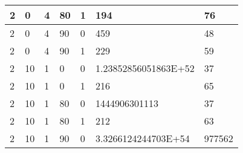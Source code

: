 \documentclass{article}
\theoremstyle{definition}
\begin{document}
\begin{table}[]
\begin{tabular}{|l|l|l|l|l|l|l|}
2                                      & 0                                       & 4                                      & 80                                   & 1                                      & 194                                      & 76                                     \\ \hline
2                                      & 0                                       & 4                                      & 90                                   & 0                                      & 459                                      & 48                                     \\ \hline
2                                      & 0                                       & 4                                      & 90                                   & 1                                      & 229                                      & 59                                     \\ \hline
2                                      & 10                                      & 1                                      & 0                                    & 0                                      & 1.23852856051863E+52                     & 37                                     \\ \hline
2                                      & 10                                      & 1                                      & 0                                    & 1                                      & 216                                      & 65                                     \\ \hline
2                                      & 10                                      & 1                                      & 80                                   & 0                                      & 1444906301113                            & 37                                     \\ \hline
2                                      & 10                                      & 1                                      & 80                                   & 1                                      & 212                                      & 63                                     \\ \hline
2                                      & 10                                      & 1                                      & 90                                   & 0                                      & 3.3266124244703E+54                      & 977562                                 \\ \hline

\end{tabular}
\end{table}
\end{document}
